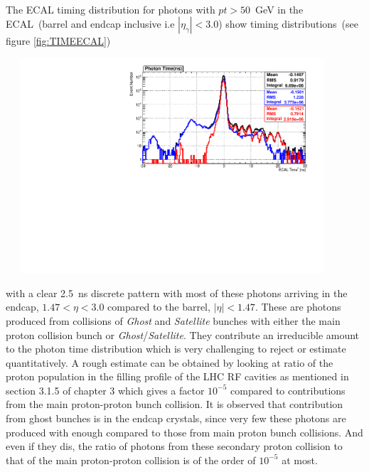 \paragraph*{}
The ECAL timing distribution for photons with $pt > 50$~GeV in the ECAL~(barrel and endcap inclusive i.e $|\eta_{\gamma}| < 3.0$) show timing distributions~(see figure \ref{fig:TIMEECAL})
\clearpage
\begin{center}
\centering
\mbox{
\includegraphics[height=8cm, width=0.9\textwidth]{THESISPLOTS/PhotonECALTimePtMTH50-C-D-SinglePhotonDataset.pdf}
}
\label{fig:TIMEECAL}
\end{center}
with a clear 2.5~ns discrete pattern with most of these photons arriving in the endcap, $ 1.47 < \eta < 3.0$ compared to the barrel, $|\eta| < 1.47$. These are photons produced from collisions of \textit{Ghost} and \textit{Satellite} bunches with either the main proton collision bunch or \textit{Ghost}/\textit{Satellite}. They contribute an irreducible amount to the photon time distribution which is very challenging to reject or estimate quantitatively. A rough estimate can be obtained by looking at ratio of the proton population in the filling profile of the LHC RF cavities as mentioned in section 3.1.5 of chapter 3 which gives a factor $10^{-5}$ compared to contributions from the main proton-proton bunch collision. It is observed that contribution from ghost bunches is in the endcap crystals, since very few these photons are produced with enough \pt compared to those from main proton bunch collisions. And even if they dis, the ratio of photons from these secondary proton collision to that of the main proton-proton collision is of the order of $10^{-5}$ at most. 
